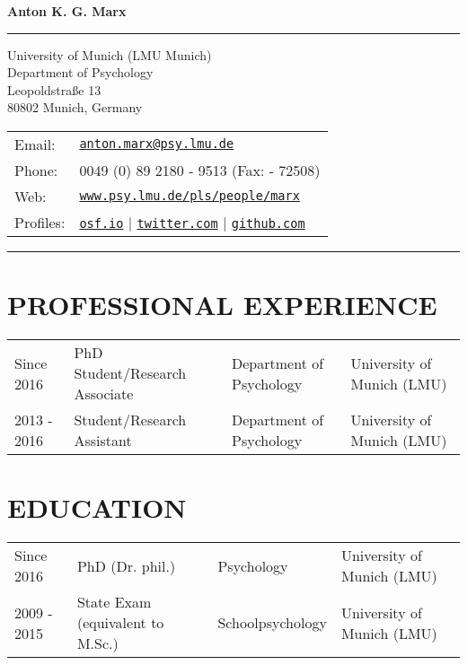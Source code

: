 \documentclass[letterpaper]{article}
\def\name{Anton K. G. Marx} %
\begin{document}

{\Huge \bf \name}


\vspace{0.1in}

\noindent\rule{\textwidth}{0.5pt} %

\vspace{0.1in}

\begin{minipage}{0.45\linewidth}
  University of Munich (LMU Munich) \\
  Department of Psychology \\
  Leopoldstraße 13 \\ 
  80802 Munich, Germany
\end{minipage}
\begin{minipage}{1.45\linewidth}
  \begin{tabular}{ll}
    Email: & \href{mailto:anton.marx@psy.lmu.de}{\tt anton.marx@psy.lmu.de} \\
    Phone: & 0049 (0) 89  2180 - 9513 (Fax: - 72508)\\
    Web: & \href{https://www.psy.lmu.de/pls/people/marx/}{\tt www.psy.lmu.de/pls/people/marx} \\
    Profiles: & \href{https://www.osf.io/z7rfu/}{\tt osf.io} | \href{https://www.twitter.com/mrxntn/}{\tt twitter.com} | \href{https://www.github.com/mrxntn/}{\tt github.com}
      \end{tabular}
\end{minipage}

\vspace{0.1in}

\noindent\rule{\textwidth}{0.5pt} %


\section*{PROFESSIONAL EXPERIENCE}
  \begin{tabular}{llll}
    Since 2016 & PhD Student/Research Associate & Department of Psychology & University of Munich (LMU)\\
    2013 - 2016 & Student/Research Assistant & Department of Psychology & University of Munich (LMU)\\
      \end{tabular}

\section*{EDUCATION}
  \begin{tabular}{llll}
    Since 2016 & PhD (Dr. phil.) & Psychology & University of Munich (LMU)\\
    2009 - 2015 & State Exam (equivalent to M.Sc.) & Schoolpsychology & University of Munich (LMU)\\
      \end{tabular}
\end{document}
